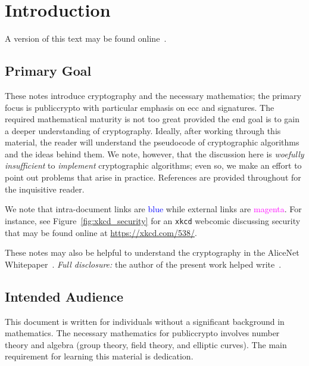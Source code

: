 \chapter{Introduction}
\label{chap:intro}

A version of this text may be found online~\cite{NotesMathCrypto}.



\section{Primary Goal}

These notes introduce cryptography and the necessary mathematics;
the primary focus is \gls{publiccrypto}
with particular emphasis on \gls{ecc} and \glspl{signature}.
The required mathematical maturity is not too great
provided the end goal is to gain a deeper understanding of cryptography.
Ideally, after working through this material, the reader
will understand the pseudocode of cryptographic algorithms
and the ideas behind them.
We note, however, that the discussion here is \emph{woefully insufficient}
to \emph{implement} cryptographic algorithms;
even so, we make an effort to point out
problems that arise in practice.
References are provided throughout for the inquisitive reader.

We note that intra-document links are \textcolor{blue}{blue}
while external links are \textcolor{magenta}{magenta}.
For instance, see Figure~\ref{fig:xkcd_security} for an
\texttt{xkcd} webcomic discussing security
that may be found online at \url{https://xkcd.com/538/}.



These notes may also be helpful to understand the cryptography in the
AliceNet Whitepaper~\cite{AliceNetWhitepaper}.
\emph{Full disclosure:} the author of the present work
helped write~\cite{AliceNetWhitepaper}.



\section{Intended Audience}

This document is written for individuals without a significant
background in mathematics.
The necessary mathematics for \gls{publiccrypto} involves
\gls{number theory} and algebra (\gls{group} theory, \gls{field} theory, and
\glspl{elliptic curve}).
The main requirement for learning this material is dedication.

